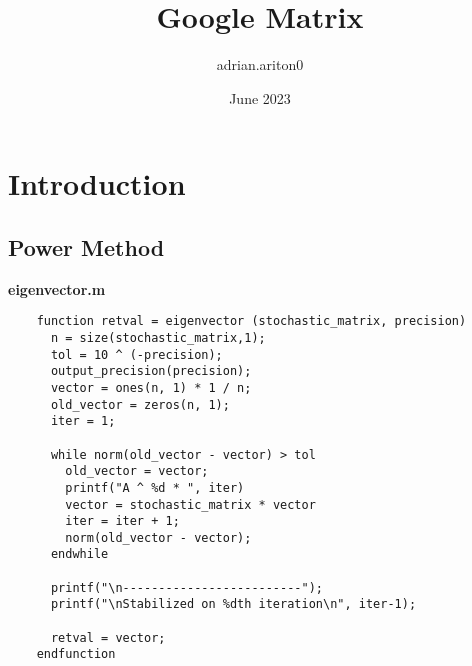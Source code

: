 \documentclass{article}
\title{Google Matrix}
\author{adrian.ariton0 }
\date{June 2023}
\begin{document}
\maketitle

\section{Introduction}
\subsection{Power Method}

    \textbf{eigenvector.m}
    \begin{lstlisting}
    function retval = eigenvector (stochastic_matrix, precision)
      n = size(stochastic_matrix,1);
      tol = 10 ^ (-precision);
      output_precision(precision);
      vector = ones(n, 1) * 1 / n;
      old_vector = zeros(n, 1);
      iter = 1;
    
      while norm(old_vector - vector) > tol
        old_vector = vector;
        printf("A ^ %d * ", iter)
        vector = stochastic_matrix * vector
        iter = iter + 1;
        norm(old_vector - vector);
      endwhile
    
      printf("\n-------------------------");
      printf("\nStabilized on %dth iteration\n", iter-1);
    
      retval = vector;
    endfunction
    \end{lstlisting}  
\end{document}
